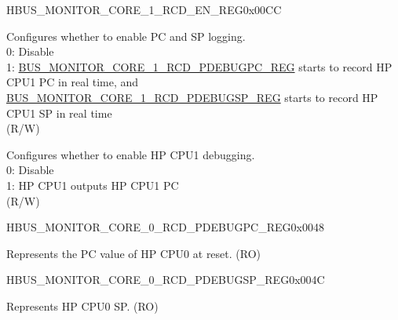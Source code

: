 \begin{register}{H}{BUS\_MONITOR\_CORE\_1\_RCD\_EN\_REG}{0x00CC}\label{regdesc:BUSMONITORCORE1RCDENREG}
%
%
%
\regnewline%
\begin{regdesc}\begin{reglist}
\label{fielddesc:BUSMONITORCORE1RCDRECORDEN}\item [BUS\_MONITOR\_CORE\_1\_RCD\_RECORDEN] Configures whether to enable PC and SP logging.\\
0: Disable\\
1: \hyperref[regdesc:BUSMONITORCORE1RCDPDEBUGPCREG]{BUS\_MONITOR\_CORE\_1\_RCD\_PDEBUGPC\_REG} starts to record HP CPU1 PC in real time, and \hyperref[regdesc:BUSMONITORCORE1RCDPDEBUGSPREG]{BUS\_MONITOR\_CORE\_1\_RCD\_PDEBUGSP\_REG} starts to record HP CPU1 SP in real time\\ (R/W)
\label{fielddesc:BUSMONITORCORE1RCDPDEBUGEN}\item [BUS\_MONITOR\_CORE\_1\_RCD\_PDEBUGEN] Configures whether to enable HP CPU1 debugging.\\
0: Disable\\
1: HP CPU1 outputs HP CPU1 PC\\ (R/W)
\end{reglist}\end{regdesc}
\end{register}


\begin{register}{H}{BUS\_MONITOR\_CORE\_0\_RCD\_PDEBUGPC\_REG}{0x0048}\label{regdesc:BUSMONITORCORE0RCDPDEBUGPCREG}
%
\regnewline%
\begin{regdesc}\begin{reglist}
\label{fielddesc:BUSMONITORCORE0RCDPDEBUGPC}\item [BUS\_MONITOR\_CORE\_0\_RCD\_PDEBUGPC] Represents the PC value of HP CPU0 at reset. (RO)


\end{reglist}\end{regdesc}
\end{register}


\begin{register}{H}{BUS\_MONITOR\_CORE\_0\_RCD\_PDEBUGSP\_REG}{0x004C}\label{regdesc:BUSMONITORCORE0RCDPDEBUGSPREG}
%
\regnewline%
\begin{regdesc}\begin{reglist}
\label{fielddesc:BUSMONITORCORE0RCDPDEBUGSP}\item [BUS\_MONITOR\_CORE\_0\_RCD\_PDEBUGSP] Represents  HP CPU0 SP. (RO)
\end{reglist}\end{regdesc}
\end{register}


